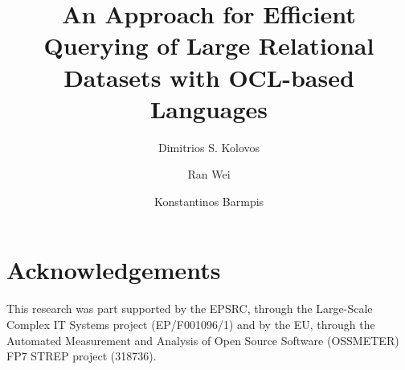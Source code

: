 \documentclass[runningheads,a4paper]{llncs}
\newcommand{\keywords}[1]{\par\addvspace\baselineskip
\noindent\keywordname\enspace\ignorespaces#1}
\begin{document}
\mainmatter  %
 
\newcommand{\TheTitle}{An Approach for Efficient Querying of Large Relational Datasets with OCL-based Languages}

\title{\TheTitle}
 

\author{Dimitrios S. Kolovos \and Ran Wei \and Konstantinos Barmpis}
%


\maketitle







\section*{Acknowledgements}

This research was part supported by the EPSRC, through the Large-Scale Complex IT Systems project (EP/F001096/1) and by the EU, through the Automated Measurement and Analysis of Open Source Software (OSSMETER) FP7 STREP project (318736).


  
\end{document}

